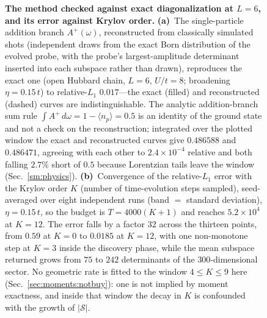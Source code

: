 \begin{figure}[tp]\centering
\caption{\textbf{The method checked against exact diagonalization at $L=6$, and its error against Krylov order.} \textbf{(a)}~The
single-particle addition branch $A^{+}(\omega)$, reconstructed from classically simulated shots
(independent draws from the exact Born distribution of the evolved probe, with the probe's
largest-amplitude determinant inserted into each subspace rather than drawn), reproduces the exact one
(open Hubbard chain, $L=6$, $U/t=8$; broadening $\eta=0.15\,t$) to relative-$L_1$ $0.017$---the exact (filled) and reconstructed
(dashed) curves are indistinguishable. The analytic addition-branch sum rule $\int A^{+}\,d\omega=1-\langle n_p\rangle=0.5$ is an identity of
the ground state and not a check on the reconstruction; integrated over the plotted window the exact
and reconstructed curves give $0.486588$ and $0.486471$, agreeing with each other to
$2.4\times10^{-4}$ relative and both falling $2.7\%$ short of $0.5$ because Lorentzian tails leave the
window (Sec.~\ref{sm:physics}). \textbf{(b)}~Convergence of the relative-$L_1$ error with
the Krylov order $K$ (number of time-evolution steps sampled), seed-averaged over eight independent
runs (band $=$ standard deviation), $\eta=0.15\,t$, so the budget is $T=4000(K{+}1)$ and reaches
$5.2\times10^{4}$ at $K=12$. The error falls by a factor $32$ across the thirteen points, from $0.59$
at $K=0$ to $0.0185$ at $K=12$, with one non-monotone step at $K=3$ inside the discovery phase, while
the mean subspace returned grows from $75$ to $242$ determinants of the $300$-dimensional sector. No
geometric rate is fitted to the window $4\le K\le9$ here (Sec.~\ref{sec:moments:notbuy}): one is
not implied by moment exactness, and inside that window the decay in $K$ is confounded with the growth
of $|\mathcal S|$.}\label{fig:method}\end{figure}
